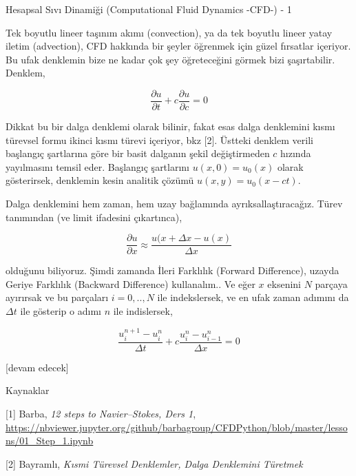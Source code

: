 \documentclass[12pt,fleqn]{article}\usepackage{../../common}
\begin{document}
Hesapsal Sıvı Dinamiği (Computational Fluid Dynamics -CFD-) - 1

Tek boyutlu lineer taşınım akımı (convection), ya da tek boyutlu lineer yatay
iletim (advection), CFD hakkında bir şeyler öğrenmek için güzel fırsatlar
içeriyor. Bu ufak denklemin bize ne kadar çok şey öğreteceğini görmek bizi
şaşırtabilir. Denklem,

$$
\frac{\partial u}{\partial t} +
c \frac{\partial u}{\partial c}  = 0
$$

Dikkat bu bir dalga denklemi olarak bilinir, fakat esas dalga denklemini kısmı
türevsel formu ikinci kısmı türevi içeriyor, bkz [2]. Üstteki denklem verili
başlangıç şartlarına göre bir basit dalganın şekil değiştirmeden $c$ hızında
yayılmasını temsil eder. Başlangıç şartlarını $u(x,0) = u_0(x)$ olarak
gösterirsek, denklemin kesin analitik çözümü $u(x,y) = u_0(x-ct)$. 

Dalga denklemini hem zaman, hem uzay bağlamında ayrıksallaştıracağız. Türev
tanımından (ve limit ifadesini çıkartınca),

$$
\frac{\partial u}{\partial x} \approx
\frac{u(x+\Delta x - u(x)}{\Delta x}
$$

olduğunu biliyoruz. Şimdi zamanda İleri Farklılık (Forward Difference), uzayda
Geriye Farklılık (Backward Difference) kullanalım.. Ve eğer $x$ eksenini $N$
parçaya ayırırsak ve bu parçaları $i=0,..,N$ ile indekslersek, ve en ufak zaman
adımını da $\Delta t$ ile gösterip o adımı $n$ ile indislersek,

$$
\frac{u_i^{n+1} - u_i^n}{\Delta t} + c \frac{u_i^{n} - u_{i-1}^n}{\Delta x} = 0
$$














[devam edecek]

Kaynaklar

[1] Barba, {\em 12 steps to Navier–Stokes, Ders 1},
    \url{https://nbviewer.jupyter.org/github/barbagroup/CFDPython/blob/master/lessons/01_Step_1.ipynb}

[2] Bayramlı, {\em Kısmi Türevsel Denklemler, Dalga Denklemini Türetmek}
\end{document}
